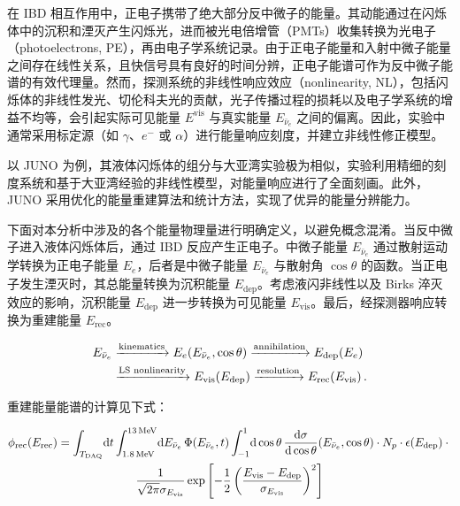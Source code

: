 在 IBD 相互作用中，正电子携带了绝大部分反中微子的能量。其动能通过在闪烁体中的沉积和湮灭产生闪烁光，进而被光电倍增管（PMTs）收集转换为光电子（photoelectrons, PE），再由电子学系统记录。由于正电子能量和入射中微子能量之间存在线性关系，且快信号具有良好的时间分辨，正电子能谱可作为反中微子能谱的有效代理量\cite{Vogel1999Neutrino}。然而，探测系统的非线性响应效应（nonlinearity, NL），包括闪烁体的非线性发光、切伦科夫光的贡献，光子传播过程的损耗以及电子学系统的增益不均等，会引起实际可见能量 $E^{\text{vis}}$ 与真实能量 $E_{\bar{\nu}_e}$ 之间的偏离。因此，实验中通常采用标定源（如 $\gamma$、$e^-$ 或 $\alpha$）进行能量响应刻度，并建立非线性修正模型\cite{Abusleme2021_Calibration}。

以 JUNO 为例，其液体闪烁体的组分与大亚湾实验极为相似，实验利用精细的刻度系统和基于大亚湾经验的非线性模型，对能量响应进行了全面刻画\cite{Adey2019_DayaBayNL}。此外，JUNO 采用优化的能量重建算法和统计方法，实现了优异的能量分辨能力。

下面对本分析中涉及的各个能量物理量进行明确定义，以避免概念混淆。当反中微子进入液体闪烁体后，通过 IBD 反应产生正电子。中微子能量 $E_{\bar{\nu}_e}$ 通过散射运动学转换为正电子能量 $E_e$，后者是中微子能量 $E_{\bar{\nu}_e}$ 与散射角 $\cos\theta$ 的函数\cite{Vogel1999_IBDkinematics}。当正电子发生湮灭时，其总能量转换为沉积能量 $E_{\text{dep}}$。考虑液闪非线性以及 Birks 淬灭效应的影响\cite{Birks1951Theory}，沉积能量 $E_{\text{dep}}$ 进一步转换为可见能量 $E_{\text{vis}}$。最后，经探测器响应转换为重建能量 $E_{\text{rec}}$。

\begin{equation}
\begin{aligned}
E_{\bar{\nu}_e}
&\xrightarrow{\text{kinematics}}
E_e(E_{\bar{\nu}_e},\cos\theta)
\xrightarrow{\text{annihilation}}
E_{\rm dep}(E_e)
\\
&\xrightarrow{\text{LS nonlinearity}}
E_{\rm vis}(E_{\rm dep})
\xrightarrow{\text{resolution}}
E_{\rm rec}(E_{\rm vis}) \, .
\end{aligned}
\end{equation}


重建能量能谱的计算见下式：

\begin{multline}
\phi_{\rm rec}(E_{\text{rec}}) = \int_{T_{\text{DAQ}}} \! \mathrm{d}t \int_{1.8\,\text{MeV}}^{13\,\text{MeV}} \! \mathrm{d}E_{\bar{\nu}_e} \, \Phi(E_{\bar{\nu}_e}, t) \int_{-1}^{1} \! \mathrm{d}\cos\theta \, \frac{\mathrm{d}\sigma}{\mathrm{d}\cos\theta}(E_{\bar{\nu}_e}, \cos\theta) \cdot N_p \cdot \epsilon(E_{\text{dep}}) \cdot {} \\
\frac{1}{\sqrt{2\pi} \sigma_{E_{\text{vis}}}} \exp\left[-\frac{1}{2} \left(\frac{E_{\text{vis}} - E_{\text{dep}}}{\sigma_{E_{\text{vis}}}} \right)^2 \right]
\label{eq:phi-Erec-integral}
\end{multline}

